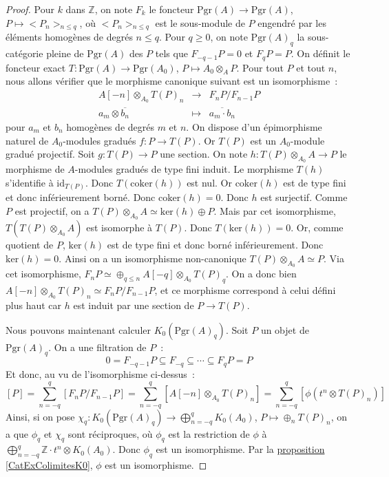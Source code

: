 \documentclass{amsart}
\newcommand{\sref}[2]{\hyperref[#2]{#1 \ref*{#2}}}
\theoremstyle{plain}
\theoremstyle{definition}
\theoremstyle{remark}
\newcommand{\ensemblenombre }[1]{\mathbb{#1}}
\newcommand{\Z}{\ensemblenombre{Z}}
\newcommand{\id}{\mathrm{id}}
\newcommand{\Pgr}[1]{\mathrm{Pgr}({#1})}
\newcommand{\ra}{\rightarrow}
\newcommand{\myker}[1]{\mathrm{ker}({#1})}
\newcommand{\coker}[1]{\mathrm{coker}({#1})}
\begin{document}
\begin{proof}
  Pour $k$ dans $\Z$, on note $F_k$ le foncteur $\Pgr{A}\ra\Pgr{A}$, $P\mapsto <P_n>_{n\leq q}$, où $<P_n>_{n\leq q}$ est le sous-module de $P$
  engendré par les éléments homogènes de degrés $n\leq q$.
  Pour $q\geq 0$, on note $\Pgr{A}_q$ la sous-catégorie pleine de $\Pgr{A}$ des $P$ tels que $F_{-q-1}P=0$ et $F_qP=P$.
  On définit le foncteur exact $T:\Pgr{A}\ra \Pgr{A_0}$, $P\mapsto A_0\otimes_A P$. Pour tout $P$ et tout $n$, nous allons vérifier que le morphisme
  canonique suivant est un isomorphisme~:
  \[
  \begin{array}{lll}
    A[-n]\otimes_{A_0}T(P)_n &\ra& F_nP/F_{n-1}P \\
    a_m\otimes \overline{b_n}&\mapsto &\overline{a_m\cdot b_n}
  \end{array}
  \]
  pour $a_m$ et $b_n$ homogènes de degrés $m$ et $n$. On dispose d'un épimorphisme naturel de $A_0$-modules gradués $f:P\ra T(P)$.
  Or $T(P)$ est un $A_0$-module gradué projectif.
  Soit $g:T(P)\ra P$ une section. On note $h:T(P)\otimes_{A_0}A\ra P$ le morphisme de $A$-modules gradués de type fini induit.
  Le morphisme $T(h)$ s'identifie à $\id_{T(P)}$. Donc $T(\coker{h})$ est nul. Or $\coker{h}$ est de type fini et donc inférieurement borné.
  Donc $\coker{h}=0$. Donc $h$ est surjectif. Comme $P$ est projectif, on a $T(P)\otimes_{A_0}A\simeq \myker{h}\oplus P$. Mais par cet isomorphisme,
  $T(T(P)\otimes_{A_0}A)$ est isomorphe à $T(P)$. Donc $T(\myker{h})=0$. Or, comme quotient de $P$, $\myker{h}$ est de type fini et donc borné
  inférieurement. Donc $\myker{h}=0$. Ainsi on a un isomorphisme non-canonique $T(P)\otimes_{A_0}A\simeq P$. Via cet isomorphisme,
  $F_nP\simeq \oplus_{q\leq n} A[-q]\otimes_{A_0} T(P)_q$. On a donc bien $A[-n]\otimes_{A_0}T(P)_n\simeq F_nP/F_{n-1}P$, et ce morphisme correspond
  à celui défini plus haut car $h$ est induit par une section de $P\ra T(P)$.

  Nous pouvons maintenant calculer $K_0(\Pgr{A}_q)$. Soit $P$ un objet de $\Pgr{A}_q$. On a une filtration de $P$~:
  $$0=F_{-q-1}P\subseteq F_{-q}\subseteq \dotsb \subseteq F_qP=P$$
  Et donc, au vu de l'isomorphisme ci-dessus~:
  $$[P]=\sum_{n=-q}^q [F_nP/F_{n-1}P]=\sum_{n=-q}^q [A[-n]\otimes_{A_0}T(P)_n]=\sum_{n=-q}^q [\phi(t^n\otimes T(P)_n)]$$
  Ainsi, si on pose $\chi_q: K_0(\Pgr{A}_q)\ra \bigoplus_{n=-q}^q K_0(A_0)$, $P\mapsto \oplus_n T(P)_n$, 
  on a que $\phi_q$ et $\chi_q$ sont réciproques, où $\phi_q$ est la restriction de $\phi$ à $\bigoplus_{n=-q}^q \Z\cdot t^n\otimes K_0(A_0)$.
  Donc $\phi_q$ est un isomorphisme. Par la \sref{proposition}{CatExColimitesK0}, $\phi$ est un isomorphisme.
\end{proof}
\end{document}
